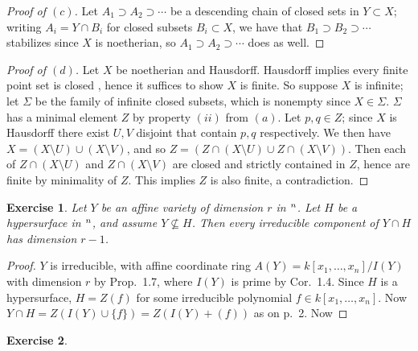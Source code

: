 \documentclass[12pt,letterpaper]{article}
\newtheorem{problem}{Exercise}[section]
\theoremstyle{definition}
\theoremstyle{remark}
\numberwithin{equation}{section}
\numberwithin{figure}{problem}
\let\AA\relax
\DeclareMathOperator{\AA}{\mathbb{A}}
\begin{document}
\begin{proof}[Proof of $(c)$]
  Let $A_1 \supset A_2 \supset \cdots$ be a descending chain of closed sets
  in $Y \subset X$; writing $A_i = Y \cap B_i$ for closed subsets
  $B_i \subset X$, we have that $B_1 \supset B_2 \supset \cdots$ stabilizes
  since $X$ is noetherian, so $A_1 \supset A_2 \supset \cdots$ does as well.
\end{proof}
\begin{proof}[Proof of $(d)$]
  Let $X$ be noetherian and Hausdorff.
  Hausdorff implies every finite point set is closed \cite[Thm.~17.8]{Mun00},
  hence it suffices to show $X$ is finite.
  So suppose $X$ is infinite; let $\Sigma$ be the family of infinite closed
  subsets, which is nonempty since $X \in \Sigma$.
  $\Sigma$ has a minimal element $Z$ by property $(ii)$ from $(a)$.
  Let $p,q \in Z$; since $X$ is Hausdorff there exist $U,V$ disjoint that
  contain $p,q$ respectively.
  We then have $X = (X \setminus U) \cup (X \setminus V)$, and so
  $Z = (Z \cap (X \setminus U) \cup Z\cap(X \setminus V))$.
  Then each of $Z \cap (X \setminus U)$ and $Z \cap (X \setminus V)$ are
  closed and strictly contained in $Z$, hence are finite by minimality of $Z$.
  This implies $Z$ is also finite, a contradiction.
\end{proof}

\begin{problem}
  Let $Y$ be an affine variety of dimension $r$ in $\AA^n$.
  Let $H$ be a hypersurface in $\AA^n$, and assume $Y \not\subseteq H$.
  Then every irreducible component of $Y \cap H$ has dimension $r-1$.
\end{problem}
\begin{proof}
  $Y$ is irreducible, with affine coordinate ring
  $A(Y) = k[x_1,\ldots,x_n]/I(Y)$ with dimension $r$ by Prop.~1.7, where
  $I(Y)$ is prime by Cor.~1.4.
  Since $H$ is a hypersurface, $H = Z(f)$ for some irreducible polynomial
  $f \in k[x_1,\ldots,x_n]$.
  Now $Y \cap H = Z(I(Y) \cup \{f\}) = Z(I(Y) + (f))$ as on p.~2. Now
\end{proof}

\begin{problem}
\end{problem}
\end{document}
